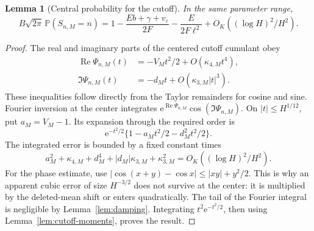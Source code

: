 \documentclass[11pt,a4paper]{article}
\numberwithin{equation}{section}
\newtheorem{lemma}[theorem]{Lemma}
\theoremstyle{definition}
\theoremstyle{remark}
\newcommand{\eps}{\varepsilon}
\newcommand{\Pp}{\mathbb P}
\newcommand{\ee}{\mathrm e}
\DeclareMathOperator{\Rea}{Re}
\begin{document}
\begin{lemma}[Central probability for the cutoff]
\label{lem:cutoff-central}
In the same parameter range,
\begin{equation}
 B\sqrt{2\pi}\,\Pp(S_{n,M}=n)
 =1-\frac{Eb+\gamma+v_{\eps}}{2F}
    -\frac{E}{2F\ell^2}
    +O_K((\log H)^2/H^2).
 \label{eq:cutoff-central}
\end{equation}
\end{lemma}
\begin{proof}
The real and imaginary parts of the centered cutoff cumulant obey
\begin{align*}
 \Rea\Psi_{n,M}(t)&=-V_Mt^2/2+O(\kappa_{4,M}t^4),\\
 \Im\Psi_{n,M}(t)&=-d_Mt+O(\kappa_{3,M}|t|^3).
\end{align*}
These inequalities follow directly from the Taylor remainders for cosine
and sine. Fourier inversion at the center integrates
\(\ee^{\Rea\Psi_{n,M}}\cos(\Im\Psi_{n,M})\).
On \(|t|\le H^{1/12}\), put \(a_M=V_M-1\).
Its expansion through the required order is
\[
 \ee^{-t^2/2}\{1-a_Mt^2/2-d_M^2t^2/2\}.
\]
The integrated error is bounded by a fixed constant times
\[
 a_M^2+\kappa_{4,M}+d_M^4
       +|d_M|\kappa_{3,M}+\kappa_{3,M}^2
 =O_K((\log H)^2/H^2).
\]
For the phase estimate, use
\(|\cos(x+y)-\cos x|\le |xy|+y^2/2\).
This is why an apparent cubic error of size \(H^{-3/2}\) does not survive
at the center: it is multiplied by the deleted-mean shift or enters
quadratically. The tail of the Fourier integral is negligible by
Lemma~\ref{lem:damping}. Integrating \(t^2\ee^{-t^2/2}\), then using
Lemma~\ref{lem:cutoff-moments}, proves the result.
\end{proof}
\end{document}
